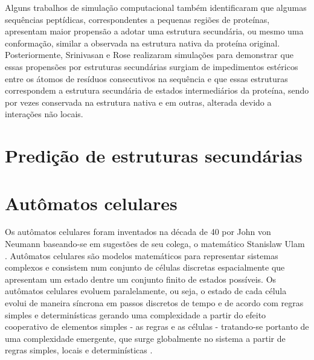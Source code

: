 Alguns trabalhos de simulação computacional \cite{Abagyan1994, Pedersen1997} também identificaram que algumas sequências peptídicas, correspondentes a pequenas regiões de proteínas, apresentam maior propensão a adotar uma estrutura secundária, ou mesmo uma conformação, similar a observada na estrutura nativa da proteína original. Posteriormente, Srinivasan e Rose \cite{Srinivasan1999} realizaram simulações para demonstrar que essas propensões por estruturas secundárias surgiam de impedimentos estéricos entre os átomos de resíduos consecutivos na sequência e que essas estruturas correspondem a estrutura secundária de estados intermediários da proteína, sendo por vezes conservada na estrutura nativa e em outras, alterada devido a interações não locais.


\section{Predição de estruturas secundárias}

\section{Autômatos celulares}

Os autômatos celulares foram inventados na década de 40 por John von Neumann baseando-se em sugestões de seu colega, o matemático Stanislaw Ulam \cite{Mitchell2009}. Autômatos celulares são modelos matemáticos para representar sistemas complexos e consistem num conjunto de células discretas espacialmente que apresentam um estado dentre um conjunto finito de estados possíveis. Os autômatos celulares evoluem paralelamente, ou seja, o estado de cada célula evolui de maneira síncrona em passos discretos de tempo e de acordo com regras simples e determinísticas gerando uma complexidade a partir do efeito cooperativo de elementos simples - as regras e as células - tratando-se portanto de uma complexidade emergente, que surge globalmente no sistema a partir de regras simples, locais e determinísticas \cite{Wolfram1984}.

